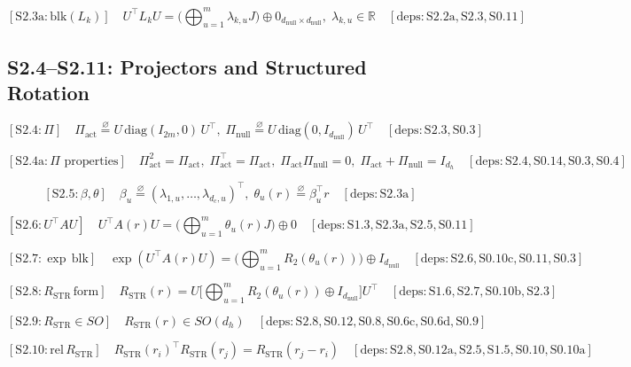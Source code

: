 \documentclass[11pt]{article}
\newcommand{\Real}{\mathbb{R}}
\newcommand{\eqdef}{\overset{\varnothing}{=}}
\newcommand{\deps}[1]{\quad[\mathrm{deps}:#1]}
\begin{document}
\[
\boxed{[\mathrm{S2}.3\mathrm{a}:\mathrm{blk}(L_k)]}\quad
U^\top L_k U=\Big(\bigoplus_{u=1}^m \lambda_{k,u}J\Big)\oplus 0_{d_{\mathrm{null}}\times d_{\mathrm{null}}},\; \lambda_{k,u}\in\Real
\deps{\mathrm{S2}.2\mathrm{a},\mathrm{S2}.3,\mathrm{S0}.11}
\]

\subsection*{S2.4--S2.11: Projectors and Structured Rotation}

\[
\boxed{[\mathrm{S2}.4:\Pi]}\quad
\Pi_{\mathrm{act}} \eqdef U\,\mathrm{diag}(I_{2m},0)\,U^\top,\;
\Pi_{\mathrm{null}} \eqdef U\,\mathrm{diag}(0,I_{d_{\mathrm{null}}})\,U^\top
\deps{\mathrm{S2}.3,\mathrm{S0}.3}
\]

\[
\boxed{[\mathrm{S2}.4\mathrm{a}:\Pi\text{ properties}]}\quad
\Pi_{\mathrm{act}}^2=\Pi_{\mathrm{act}},\; \Pi_{\mathrm{act}}^\top=\Pi_{\mathrm{act}},\;
\Pi_{\mathrm{act}}\Pi_{\mathrm{null}}=0,\;
\Pi_{\mathrm{act}}+\Pi_{\mathrm{null}}=I_{d_h}
\deps{\mathrm{S2}.4,\mathrm{S0}.14,\mathrm{S0}.3,\mathrm{S0}.4}
\]

\[
\boxed{[\mathrm{S2}.5:\beta,\theta]}\quad
\beta_u \eqdef (\lambda_{1,u},\dots,\lambda_{d_c,u})^\top,\;
\theta_u(r) \eqdef \beta_u^\top r
\deps{\mathrm{S2}.3\mathrm{a}}
\]

\[
\boxed{[\mathrm{S2}.6:U^\top A U]}\quad
U^\top A(r)U=\Big(\bigoplus_{u=1}^m \theta_u(r)J\Big)\oplus 0
\deps{\mathrm{S1}.3,\mathrm{S2}.3\mathrm{a},\mathrm{S2}.5,\mathrm{S0}.11}
\]

\[
\boxed{[\mathrm{S2}.7:\exp\,\mathrm{blk}]}\quad
\exp(U^\top A(r)U)=\Big(\bigoplus_{u=1}^m R_2(\theta_u(r))\Big)\oplus I_{d_{\mathrm{null}}}
\deps{\mathrm{S2}.6,\mathrm{S0}.10\mathrm{c},\mathrm{S0}.11,\mathrm{S0}.3}
\]

\[
\boxed{[\mathrm{S2}.8:R_{\mathrm{STR}}\,\mathrm{form}]}\quad
R_{\mathrm{STR}}(r)=U\Big[\bigoplus_{u=1}^m R_2(\theta_u(r))\oplus I_{d_{\mathrm{null}}}\Big]U^\top
\deps{\mathrm{S1}.6,\mathrm{S2}.7,\mathrm{S0}.10\mathrm{b},\mathrm{S2}.3}
\]

\[
\boxed{[\mathrm{S2}.9:R_{\mathrm{STR}}\in SO]}\quad
R_{\mathrm{STR}}(r)\in SO(d_h)
\deps{\mathrm{S2}.8,\mathrm{S0}.12,\mathrm{S0}.8,\mathrm{S0}.6\mathrm{c},\mathrm{S0}.6\mathrm{d},\mathrm{S0}.9}
\]

\[
\boxed{[\mathrm{S2}.10:\mathrm{rel}\,R_{\mathrm{STR}}]}\quad
R_{\mathrm{STR}}(r_i)^\top R_{\mathrm{STR}}(r_j)=R_{\mathrm{STR}}(r_j-r_i)
\deps{\mathrm{S2}.8,\mathrm{S0}.12\mathrm{a},\mathrm{S2}.5,\mathrm{S1}.5,\mathrm{S0}.10,\mathrm{S0}.10\mathrm{a}}
\]
\end{document}
